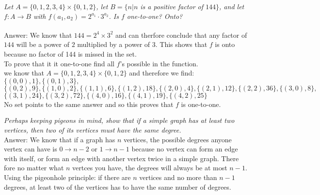 \documentclass[12pt,letterpaper]{exam}
\begin{document}
\begin{questions}
\question[3.12]
\emph{Let $A=\{0,1,2,3,4\}\times \{0,1,2\}$, let $B=\{n | n$ is a positive factor of $144\}$, and let $f:A\rightarrow B$ with $f(a_1,a_2)=2^{a_1}\cdot 3^{a_2}$. Is $f$ one-to-one? Onto?}
\\
\\
Answer:
We know that $144=2^4 \times 3^2$ and can therfore conclude that any factor of $144$ will be a power of $2$ multiplied by a power of $3$. This shows that $f$ is onto because no factor of 144 is missed in the set.
\\
To prove that it it one-to-one find all $f$'s possible in the function. 
\\
we know that $A=\{0,1,2,3,4\}\times \{0,1,2\}$ and therefore we find: $\{(0,0),1\}, \{(0,1),3\},$ 
\\
$\{(0,2),9\}, \{(1,0),2\}, \{(1,1),6\}, \{(1,2),18\}, \{(2,0),4\}, \{(2,1),12\}, \{(2,2),36\}, \{(3,0),8\},$
\\
$\{(3,1),24\}, \{(3,2),72\}, \{(4,0),16\}, \{(4,1),19\}, \{(4,2),25\}$
\\
No set points to the same answer and so this proves that $f$ is one-to-one.





\question[3.13]
\emph{Perhaps keeping pigeons in mind, show that if a simple graph has at least two vertices, then two of its vertices must have the same degree.}
\\

Answer: We know that if a graph has $n$ vertices, the possible degrees anyone vertex can have is $0 \rightarrow n-2$ or $1 \rightarrow n-1$ because no vertex can form an edge with itself, or form an edge with another vertex twice in a simple graph. There fore no matter what $n$ vertces you have, the degrees will always be at most $n-1$.
\\
Using the pigeonhole principle: if there are $n$ vertices and no more than $n-1$ degrees, at least two of the vertices has to have the same number of degrees.









\end{questions}
\end{document}
